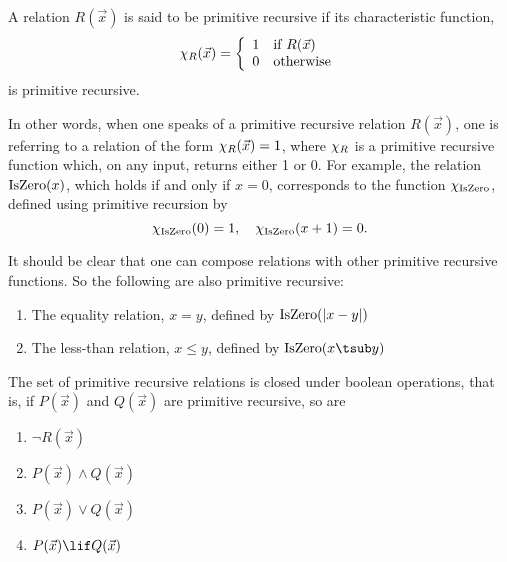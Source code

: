 \documentclass[../../../include/open-logic-section]{subfiles}
\begin{document}


\begin{defn}
A relation $R(\vec x)$ is said to be primitive recursive if its characteristic
function,
\[
\Char{R}(\vec x) = \left\{
  \begin{array}{ll}
  1 & \mbox{if $R(\vec x)$} \\
  0 & \mbox{otherwise}
  \end{array}
\right.
\]
is primitive recursive.
\end{defn}

In other words, when one speaks of a primitive recursive relation
$R(\vec x)$, one is referring to a relation of the form $\chi_{R}(\vec
x) = 1$, where $\chi_{R}$ is a primitive recursive function which, on
any input, returns either 1 or 0. For example, the relation
$\mathrm{IsZero}(x)$, which holds if and only if $x = 0$, corresponds to the
function $\chi_{\mathrm{IsZero}}$, defined using primitive recursion by
\[
\chi_{\mathrm{IsZero}}(0) = 1, \quad \chi_{\mathrm{IsZero}}(x+1) = 0.
\]

It should be clear that one can compose relations with other primitive
recursive functions. So the following are also primitive recursive:
\begin{enumerate}
\item The equality relation, $x = y$, defined by $\mathrm{IsZero}(\left|x -
  y\right|)$
\item The less-than relation, $x \leq y$, defined by $\fn{IsZero}(x
  \tsub y)$
\end{enumerate}


\begin{prop}
  The set of primitive recursive relations is closed under boolean
  operations, that is, 
  if $P(\vec x)$ and $Q(\vec x)$ are primitive recursive, so are
  \begin{enumerate}
  \item $\lnot R(\vec x)$
  \item $P(\vec x) \land Q(\vec x)$
  \item $P(\vec x) \lor Q(\vec x)$
  \item $P(\vec x) \lif Q(\vec x)$
  \end{enumerate}
\end{prop}
\end{document}
